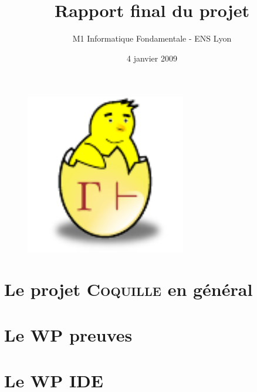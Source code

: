 \documentclass[a4paper,10pt]{article}
\date{4 janvier 2009}
\title{Rapport final du projet \coquille{}}
\author{M1 Informatique Fondamentale - ENS Lyon}
\newcommand{\coquille}{\textsc{Coquille}}
\begin{document}
\begin{figure}
\begin{center}
 \includegraphics[width=7cm]{poussin.pdf}
\end{center}
\end{figure}
\maketitle
\newpage

\tableofcontents
\newpage

\part{Le projet \coquille{} en g\'en\'eral}



\part{Le WP preuves}



\part{Le WP IDE}


% 



\end{document}
